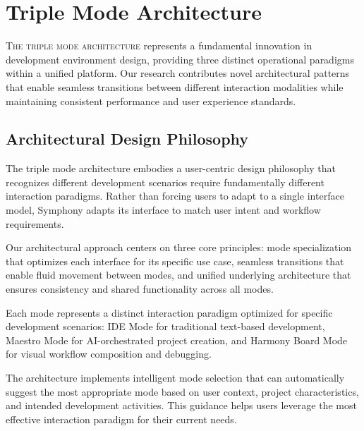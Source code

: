 
\section*{Triple Mode Architecture}

\lettrine{T}{he triple mode architecture} represents a fundamental innovation in development environment design, providing three distinct operational paradigms within a unified platform. Our research contributes novel architectural patterns that enable seamless transitions between different interaction modalities while maintaining consistent performance and user experience standards.

\subsection*{Architectural Design Philosophy}

The triple mode architecture embodies a user-centric design philosophy that recognizes different development scenarios require fundamentally different interaction paradigms. Rather than forcing users to adapt to a single interface model, Symphony adapts its interface to match user intent and workflow requirements.

Our architectural approach centers on three core principles: mode specialization that optimizes each interface for its specific use case, seamless transitions that enable fluid movement between modes, and unified underlying architecture that ensures consistency and shared functionality across all modes.

\begin{infobox}[title=Mode Design Principles]
Each mode represents a distinct interaction paradigm optimized for specific development scenarios: IDE Mode for traditional text-based development, Maestro Mode for AI-orchestrated project creation, and Harmony Board Mode for visual workflow composition and debugging.
\end{infobox}

The architecture implements intelligent mode selection that can automatically suggest the most appropriate mode based on user context, project characteristics, and intended development activities. This guidance helps users leverage the most effective interaction paradigm for their current needs.

